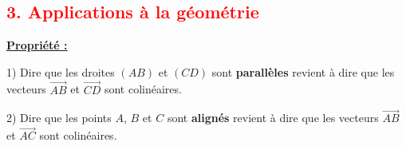 \documentclass[12pt]{article}
\begin{document}
\subsection*{\textcolor{red}{3. Applications à la géométrie}}

\vspace{5pt}

\begin{mdframed}[
    linewidth=1pt,
    roundcorner=5pt,
    linecolor=Red,
    innertopmargin=10pt,
    innerbottommargin=10pt
]
{\color{Red}\textbf{\underline{Propriété :}}}

\vspace{5pt}
1) Dire que les droites $(AB)$ et $(CD)$ sont \textbf{parallèles} revient à dire que les 
vecteurs $\overrightarrow{AB}$ et $\overrightarrow{CD}$ sont colinéaires.

\vspace{5pt}
2) Dire que les points $A$, $B$ et $C$ sont \textbf{alignés} revient à dire que les vecteurs 
$\overrightarrow{AB}$ et $\overrightarrow{AC}$ sont colinéaires.
\end{mdframed}

\vspace{5pt}
\end{document}
